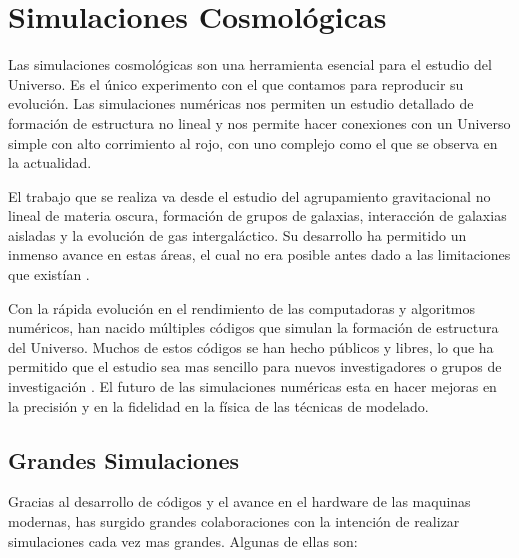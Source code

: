
\chapter{Simulaciones Cosmológicas}
\label{chap:2 Sim}
\setcounter{equation}{0}

\noindent Las simulaciones cosmológicas son una herramienta esencial para el estudio del Universo. Es el único experimento con el que contamos para reproducir su evolución. Las simulaciones numéricas nos permiten un estudio detallado de formación de estructura no lineal y nos permite hacer conexiones con un Universo simple con alto corrimiento al rojo, con uno complejo como el que se observa en la actualidad.

El trabajo que se realiza va desde el estudio del agrupamiento gravitacional no lineal de materia oscura, formación de grupos de galaxias, interacción de galaxias aisladas y la evolución de gas intergaláctico. Su desarrollo ha permitido un inmenso avance en estas áreas, el cual no era posible antes dado a las limitaciones que existían \cite{2001NewA....6...79S}.


Con la rápida evolución en el rendimiento de las computadoras y algoritmos numéricos, han nacido múltiples códigos que simulan la formación de estructura del Universo. Muchos de estos códigos se han hecho públicos y libres, lo que ha permitido que el estudio sea mas sencillo para nuevos investigadores o grupos de investigación \cite{2021MNRAS.506.2871S}. El futuro de las simulaciones numéricas esta en hacer mejoras en la precisión y en la fidelidad en la física de las técnicas de modelado.


\section{Grandes Simulaciones}

Gracias al desarrollo de códigos y el avance en el hardware de las maquinas modernas, has surgido grandes colaboraciones con la intención de realizar simulaciones cada vez mas grandes. Algunas de ellas son:

